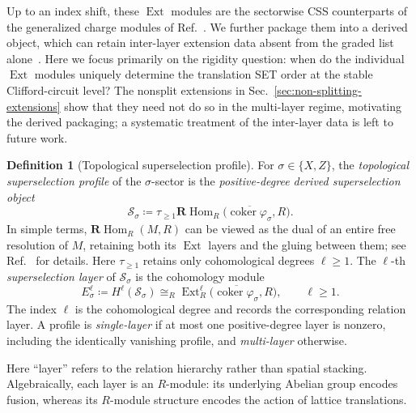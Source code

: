 \documentclass[aps,prx,english,superscriptaddress,twocolumn,tightenlines,showpacs,longbibliography,floatfix,amsfonts]{revtex4-2}
\theoremstyle{remark}
\theoremstyle{definition}
\newtheorem{definition}{Definition}
\begin{document}
Up to an index shift, these \(\operatorname{Ext}\) modules are the sectorwise
CSS counterparts of the generalized charge modules of Ref.~\cite{Yang2023}.
We further package them into a derived object, which can retain inter-layer
extension data absent from the graded list alone~\cite[Chap.~10]{weibel1994introduction}.
Here we focus primarily on the rigidity question: when do the individual
\(\operatorname{Ext}\) modules uniquely determine the translation SET order at
the stable Clifford-circuit level? The nonsplit extensions in
Sec.~\ref{sec:non-splitting-extensions} show that they need not do so in the
multi-layer regime, motivating the derived packaging; a systematic treatment
of the inter-layer data is left to future work.

\begin{definition}[Topological superselection profile]
\label{def:superselection-profile}
For \(\sigma\in\{X,Z\}\), the \emph{topological superselection profile} of the
\(\sigma\)-sector is the \emph{positive-degree derived superselection object}
\begin{equation}
	\mathscr S_\sigma
	\coloneqq
	\tau_{\geq1}\mathbf R\!\operatorname{Hom}_R
	\bigl(\overline{\operatorname{coker}\varphi_\sigma},R\bigr).
		\label{eq:superselection-profile}
\end{equation}
In simple terms, \(\mathbf R\!\operatorname{Hom}_R(M,R)\) can be viewed as the
dual of an entire free resolution of \(M\), retaining both its
\(\operatorname{Ext}\) layers and the gluing between them; see
Ref.~\cite[Sec.~10.7]{weibel1994introduction} for details.
Here \(\tau_{\geq1}\) retains only cohomological degrees \(\ell\geq1\). The
\(\ell\)-th \emph{superselection layer} of \(\mathscr S_\sigma\) is the
cohomology module
\begin{equation}
	E_\sigma^\ell
	\coloneqq
	H^\ell(\mathscr S_\sigma)
	\cong_R
	\operatorname{Ext}_R^\ell
	\bigl(\overline{\operatorname{coker}\varphi_\sigma},R\bigr),
	\qquad \ell\geq 1.
	\label{eq:superselection-layers}
\end{equation}
The index \(\ell\) is the cohomological degree and records the corresponding
relation layer. A profile is
\emph{single-layer} if at most one positive-degree layer is nonzero, including
the identically vanishing profile, and \emph{multi-layer} otherwise.
\end{definition}

Here ``layer'' refers to the relation hierarchy rather than spatial stacking.
Algebraically, each layer is an \(R\)-module: its underlying Abelian group
encodes fusion, whereas its \(R\)-module structure encodes the action of
lattice translations.
\end{document}
